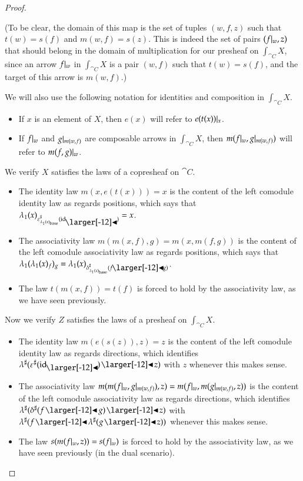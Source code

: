 \documentclass{amsart}
\begin{document}
\begin{proof}
\begin{itemize}
    (To be clear, the domain of this map is the set of tuples
    $(w, f, z)$ such that $t(w) = s(f)$ and $m(w, f) = s(z)$. This is
    indeed the set of pairs $(f|_{w}, z)$ that should belong in the
    domain of multiplication for our presheaf on $\int_{\cat{C}}X$,
    since an arrow $f|_{w}$ in $\int_{\cat{C}}X$ is a pair $(w, f)$ such
    that $t(w) = s(f)$, and the target of this arrow is $m(w, f)$.)
  \end{itemize}

  We will also use the following notation for identities and
  composition in $\int_{\cat{C}}X$.
  \begin{itemize}
  \item If $x$ is an element of $X$, then $e(x)$ will refer to
    $e(t(x))|_{x}$.
  \item If $f|_{w}$ and $g|_{m(w,f)}$ are composable arrows in
    $\int_{\cat{C}}X$, then $m(f|_{w}, g|_{m(w,f)})$ will refer to
    $m(f, g)|_{w}$.
  \end{itemize}

  We verify $X$ satisfies the laws of a copresheaf on $\cat{C}$.
  \begin{itemize}
  \item The identity law $m(x, e(t(x))) = x$ is the content of the left
    comodule identity law as regards positions, which says that
    $\posmapof{\lambda}{x}_{\dirmapof{\varepsilon}{\posmapof{\lambda}{x}_\base}{\idsubd}} = x$.
  \item The associativity law $m(m(x, f), g) = m(x, m(f, g))$ is the
    content of the left comodule associativity law as regards positions,
    which says that
    $\posmapof{\lambda}{\posmapof{\lambda}{x}_f}_g =
    \posmapof{\lambda}{x}_{\dirmapof{\delta}{\posmapof{\lambda}{x}_\base}{f
        \subd g}}$.
  \item The law $t(m(x, f)) = t(f)$ is forced to hold by the
    associativity law, as we have seen previously.
  \end{itemize}
  
  Now we verify $Z$ satisfies the laws of a presheaf on $\int_{\cat{C}}X$.
  \begin{itemize}
  \item The identity law $m(e(s(z)), z) = z$ is the content of the left
    comodule identity law as regards directions, which identifies
    ${\anydirmapof{\lambda}{\anydirmapof{\varepsilon}{\idsubd} \subd z}}$
    with $z$ whenever this makes sense.
  \item The associativity law
    $m(m(f|_{w}, g|_{m(w,f)}), z) = m(f|_{w}, m(g|_{m(w,f)}, z))$ is the
    content of the left comodule associativity law as regards
    directions, which identifies
    ${\anydirmapof{\lambda}{\anydirmapof{\delta}{f \subd g} \subd z}}$
    with
    ${\anydirmapof{\lambda}{f \subd \anydirmapof{\lambda}{g \subd z}}}$
    whenever this makes sense.
  \item The law $s(m(f|_{w}, z)) = s(f|_{w})$ is forced to hold by the
    associativity law, as we have seen previously (in the dual
    scenario).
  \end{itemize}


\end{proof}
\end{document}
